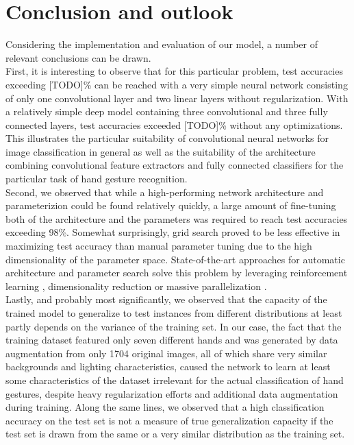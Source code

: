 \documentclass[a4paper]{article}
\begin{document}
\section{Conclusion and outlook}
Considering the implementation and evaluation of our model, a number of relevant conclusions can be drawn.\\
First, it is interesting to observe that for this particular problem, test accuracies exceeding [TODO]\% can be reached with a very simple neural network consisting of only one convolutional layer and two linear layers without regularization. With a relatively simple deep model containing three convolutional and three fully connected layers, test accuracies exceeded [TODO]\% without any optimizations. This illustrates the particular suitability of convolutional neural networks for image classification in general as well as the suitability of the architecture combining convolutional feature extractors and fully connected classifiers for the particular task of hand gesture recognition.\\
Second, we observed that while a high-performing network architecture and parameterizion could be found relatively quickly, a large amount of fine-tuning both of the architecture and the parameters was required to reach test accuracies exceeding 98\%. Somewhat surprisingly, grid search proved to be less effective in maximizing test accuracy than manual parameter tuning due to the high dimensionality of the parameter space. State-of-the-art approaches for automatic architecture and parameter search solve this problem by leveraging reinforcement learning \cite{Zoph2016}, dimensionality reduction \cite{Hinz2018} or massive parallelization \cite{Li2018}.\\
Lastly, and probably most significantly, we observed that the capacity of the trained model to generalize to test instances from different distributions at least partly depends on the variance of the training set. In our case, the fact that the training dataset featured only seven different hands and was generated by data augmentation from only 1704 original images, all of which share very similar backgrounds and lighting characteristics, caused the network to learn at least some characteristics of the dataset irrelevant for the actual classification of hand gestures, despite heavy regularization efforts and additional data augmentation during training. Along the same lines, we observed that a high classification accuracy on the test set is not a measure of true generalization capacity if the test set is drawn from the same or a very similar distribution as the training set.\\
\end{document}
